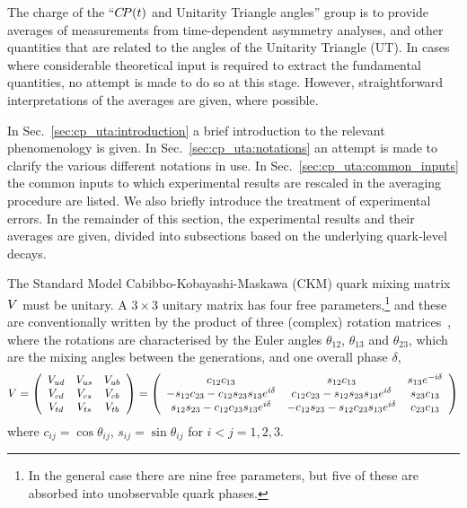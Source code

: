 \label{sec:cp_uta}

The charge of the ``$C\!P(t)$ and Unitarity Triangle angles'' group
is to provide averages of measurements 
from time-dependent asymmetry analyses,
and other quantities that are related 
to the angles of the Unitarity Triangle (UT).
In cases where considerable theoretical input is required to 
extract the fundamental quantities, no attempt is made to do so at 
this stage. However, straightforward interpretations of the averages 
are given, where possible.

In Sec.~\ref{sec:cp_uta:introduction} 
a brief introduction to the relevant phenomenology is given.
In Sec.~\ref{sec:cp_uta:notations}
an attempt is made to clarify the various different notations in use.
In Sec.~\ref{sec:cp_uta:common_inputs}
the common inputs to which experimental results are rescaled in the
averaging procedure are listed. 
We also briefly introduce the treatment of experimental errors. 
In the remainder of this section,
the experimental results and their averages are given,
divided into subsections based on the underlying quark-level decays.

\label{sec:cp_uta:introduction}

The Standard Model Cabibbo-Kobayashi-Maskawa (CKM) quark mixing matrix ${V}$ 
must be unitary. A $3 \times 3$ unitary matrix has four free parameters,\footnote{
  In the general case there are nine free parameters,
  but five of these are absorbed into unobservable quark phases.}
and these are conventionally written by the product
of three (complex) rotation matrices~\cite{Chau:1984fp}, 
where the rotations are characterised by the Euler angles 
$\theta_{12}$, $\theta_{13}$ and $\theta_{23}$, which are the mixing angles
between the generations, and one overall phase $\delta$,
\begin{equation}
\label{eq:ckmPdg}
{V} =
        \left(
          \begin{array}{ccc}
            V_{ud} & V_{us} & V_{ub} \\
            V_{cd} & V_{cs} & V_{cb} \\
            V_{td} & V_{ts} & V_{tb} \\
          \end{array}
        \right)
        =
        \left(
        \begin{array}{ccc}
        c_{12}c_{13}    
                &    s_{12}c_{13}   
                        &   s_{13}e^{-i\delta}  \\
        -s_{12}c_{23}-c_{12}s_{23}s_{13}e^{i\delta} 
                &  c_{12}c_{23}-s_{12}s_{23}s_{13}e^{i\delta} 
                        & s_{23}c_{13} \\
        s_{12}s_{23}-c_{12}c_{23}s_{13}e^{i\delta}  
                &  -c_{12}s_{23}-s_{12}c_{23}s_{13}e^{i\delta} 
                        & c_{23}c_{13} 
        \end{array}
        \right)
\end{equation}
where $c_{ij}=\cos\theta_{ij}$, $s_{ij}=\sin\theta_{ij}$ for 
$i<j=1,2,3$. 

